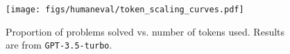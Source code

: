 \begin{figure}[ht]
    \centering
    \begin{minipage}{0.38\textwidth}
        \texttt{[image: figs/humaneval/token\_scaling\_curves.pdf]}
        \label{fig:turbo_token_scaling}
    \end{minipage}
    \caption{Proportion of problems solved vs. number of tokens used. Results are from \texttt{GPT-3.5-turbo}.}
    \label{fig:token_scaling}
\end{figure}